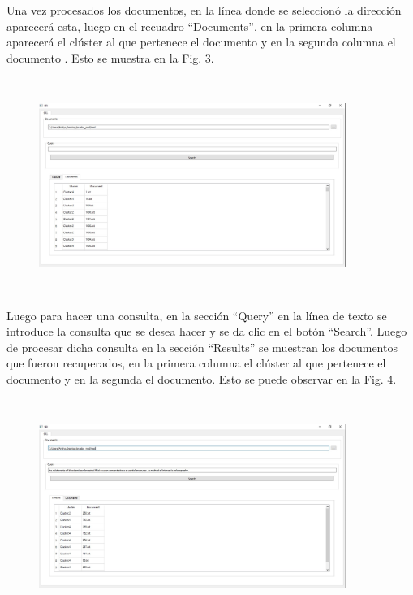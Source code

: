 \documentclass{llncs}
\begin{document}
Una vez procesados los documentos, en la l\'inea donde se seleccion\'o la direcci\'on aparecer\'a esta, luego en el recuadro ``Documents'', en la primera columna aparecer\'a el cl\'uster al que pertenece el documento y en la segunda columna el documento . Esto se muestra en la Fig. 3.\\

\begin{figure}
	\centering
	\includegraphics[width = 10cm, height = 7cm]{app/process.jpg}
	\caption{}
\end{figure}

Luego para hacer una consulta, en la secci\'on ``Query'' en la l\'inea de texto se introduce la consulta que se desea hacer y se da clic en el bot\'on ``Search''. Luego de procesar dicha consulta en la secci\'on ``Results'' se muestran los documentos que fueron recuperados, en la primera columna el cl\'uster al que pertenece el documento y en la segunda el documento. Esto se puede observar en la Fig. 4.\\

\begin{figure}
	\centering
	\includegraphics[width = 10cm, height = 7cm]{app/query.jpg}
	\caption{}
\end{figure}
\end{document}
